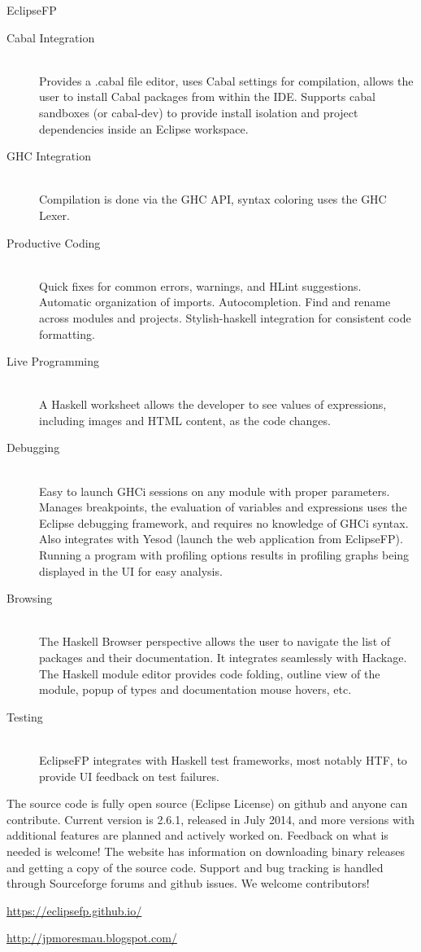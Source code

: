 \begin{hcarentry}[updated]{EclipseFP}
\begin{description}
  \item[Cabal Integration] \hfill \\ Provides a .cabal file editor, uses Cabal
    settings for compilation, allows the user to install Cabal packages from
    within the IDE. Supports cabal sandboxes (or cabal-dev) to provide install isolation and project
    dependencies inside an Eclipse workspace.  \item[GHC Integration] \hfill
    \\ Compilation is done via the GHC API, syntax coloring uses the GHC
  Lexer.  \item[Productive Coding] \hfill \\ Quick fixes for common errors,
    warnings, and HLint suggestions. Automatic organization of imports.
    Autocompletion. Find and rename across modules and projects.
    Stylish-haskell integration for consistent code formatting.
  \item[Live Programming] \hfill \\ A Haskell worksheet allows the developer to see
    values of expressions, including images and HTML content, as the code changes.
  \item[Debugging] \hfill \\ Easy to launch GHCi sessions on any module with
    proper parameters. Manages breakpoints, the evaluation of variables and
    expressions uses the Eclipse debugging framework, and requires no
    knowledge of GHCi syntax. Also integrates with Yesod (launch the web
    application from EclipseFP). Running a program with profiling options
    results in profiling graphs being displayed in the UI for easy analysis.
  \item[Browsing] \hfill \\ The Haskell Browser perspective allows the user to
    navigate the list of packages and their documentation. It integrates
    seamlessly with Hackage. The Haskell module editor provides code folding,
    outline view of the module, popup of types and documentation mouse hovers,
    etc.  \item[Testing] \hfill \\ EclipseFP integrates with Haskell test
      frameworks, most notably HTF, to provide UI feedback on test failures.
\end{description}

The source code is fully open source (Eclipse License) on github and anyone
can contribute. Current version is 2.6.1, released in July 2014, and more
versions with additional features are planned and actively worked on. Feedback
on what is needed is welcome! The website has information on downloading
binary releases and getting a copy of the source code. Support and bug
tracking is handled through Sourceforge forums and github issues. We welcome
contributors!

\FurtherReading
\begin{compactitem}
\item \url{https://eclipsefp.github.io/}
\item \url{http://jpmoresmau.blogspot.com/}
\end{compactitem}
\end{hcarentry}
